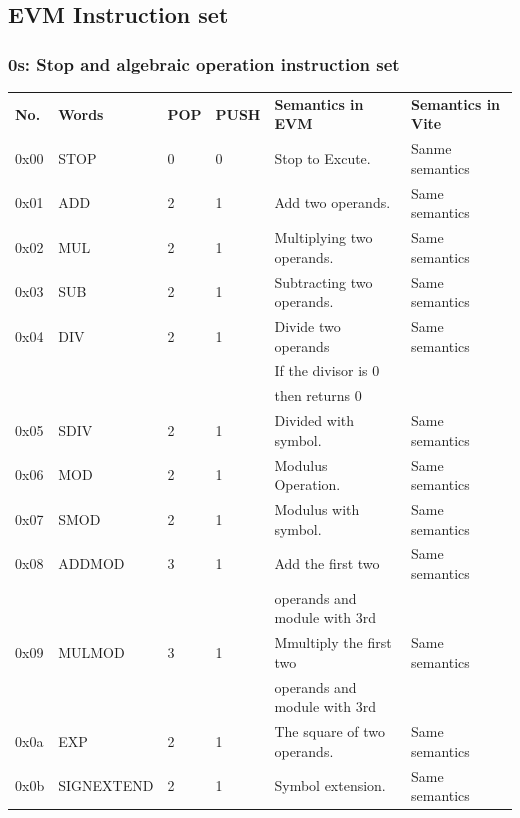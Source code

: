 \documentclass[UTF8,nofonts]{article}
\begin{document}
\begin{appendices}

\section{EVM Instruction set\label{app:evm-instruction-set}}
\subsubsection{0s: Stop and algebraic operation instruction set}
\begin{tabu}{l l l l l l} 
\toprule

\textbf{No.} & \textbf{Words} & \textbf{POP} & \textbf{PUSH} & \textbf{Semantics in EVM} & \textbf{Semantics in Vite}  \vspace{5pt} \\
0x00 & {\small STOP} & 0 & 0 & Stop to Excute. &  Sanme semantics\\
\midrule
0x01 & {\small ADD} & 2 & 1 & Add two operands. & Same semantics\\
\midrule
0x02 & {\small MUL} & 2 & 1 & Multiplying two operands. & Same semantics\\
\midrule
0x03 & {\small SUB} & 2 & 1 & Subtracting two operands. & Same semantics\\
\midrule
0x04 & {\small DIV} & 2 & 1 & Divide two operands & Same semantics\\
&&&&  If the divisor is 0 \\ 
&&&&  then returns 0 \\

\midrule
0x05 & {\small SDIV} & 2 & 1 & Divided with symbol. & Same semantics\\
\midrule
0x06 & {\small MOD} & 2 & 1 & Modulus Operation. & Same semantics\\
\midrule
0x07 & {\small SMOD} & 2 & 1 & Modulus with symbol. & Same semantics\\
\midrule
0x08 & {\small ADDMOD} & 3 & 1 &Add the first two & Same semantics\\
&&&& operands and module with 3rd \\

\midrule
0x09 & {\small MULMOD} & 3 & 1 & Mmultiply the first two  & Same semantics\\
&&&& operands and module with 3rd \\
\midrule
0x0a & {\small EXP} & 2 & 1 & The square of two operands. & Same semantics\\
\midrule
0x0b & {\small SIGNEXTEND} & 2 & 1 & Symbol extension. & Same semantics\\
\midrule
\end{tabu}


\end{appendices}
\end{document}
